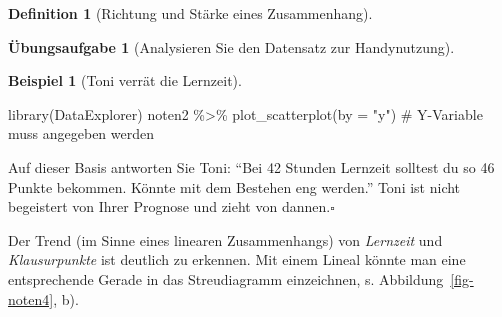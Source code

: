 \documentclass[
  a4paper,
  DIV=11]{scrreprt}
\newenvironment{Shaded}{\begin{snugshade}}{\end{snugshade}}
\newcommand{\AttributeTok}[1]{\textcolor[rgb]{0.40,0.45,0.13}{#1}}
\newcommand{\CommentTok}[1]{\textcolor[rgb]{0.37,0.37,0.37}{#1}}
\newcommand{\FunctionTok}[1]{\textcolor[rgb]{0.28,0.35,0.67}{#1}}
\newcommand{\NormalTok}[1]{\textcolor[rgb]{0.00,0.23,0.31}{#1}}
\newcommand{\SpecialCharTok}[1]{\textcolor[rgb]{0.37,0.37,0.37}{#1}}
\newcommand{\StringTok}[1]{\textcolor[rgb]{0.13,0.47,0.30}{#1}}
\theoremstyle{definition}
\newtheorem{exercise}{Übungsaufgabe}[chapter]
\theoremstyle{definition}
\newtheorem{example}{Beispiel}[chapter]
\theoremstyle{definition}
\newtheorem{definition}{Definition}[chapter]
\theoremstyle{remark}
\begin{document}
\begin{definition}[Richtung und Stärke eines
Zusammenhang]
\begin{exercise}[Analysieren Sie den Datensatz zur
Handynutzung]
\begin{example}[Toni verrät die
Lernzeit]
\begin{Shaded}
\begin{Highlighting}[]
\FunctionTok{library}\NormalTok{(DataExplorer)}
\NormalTok{noten2 }\SpecialCharTok{\%\textgreater{}\%} 
  \FunctionTok{plot\_scatterplot}\NormalTok{(}\AttributeTok{by =} \StringTok{"y"}\NormalTok{)  }\CommentTok{\# Y{-}Variable muss angegeben werden}
\end{Highlighting}
\end{Shaded}

Auf dieser Basis antworten Sie Toni: ``Bei 42 Stunden Lernzeit solltest
du so 46 Punkte bekommen. Könnte mit dem Bestehen eng werden.'' Toni ist
nicht begeistert von Ihrer Prognose und zieht von dannen.\(\square\)

\end{example}

Der Trend (im Sinne eines linearen Zusammenhangs) von \emph{Lernzeit}
und \emph{Klausurpunkte} ist deutlich zu erkennen. Mit einem Lineal
könnte man eine entsprechende Gerade in das Streudiagramm einzeichnen,
s. Abbildung~\ref{fig-noten4}, b).

\begin{figure}

\begin{minipage}{0.50\linewidth}



\end{minipage}%
%
\begin{minipage}{0.50\linewidth}


\end{minipage}
\end{figure}
\end{exercise}
\end{definition}
\end{document}
